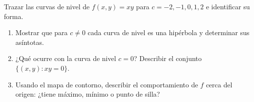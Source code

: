 Trazar las curvas de nivel de $f(x,y) = xy$ para $c = -2, -1, 0, 1, 2$ e identificar su forma.
\begin{enumerate}
    \item Mostrar que para $c \neq 0$ cada curva de nivel es una hipérbola y determinar sus asíntotas.
    \item ¿Qué ocurre con la curva de nivel $c = 0$? Describir el conjunto $\{(x,y): xy = 0\}$.
    \item Usando el mapa de contorno, describir el comportamiento de $f$ cerca del origen: ¿tiene máximo, mínimo o punto de silla?
\end{enumerate}